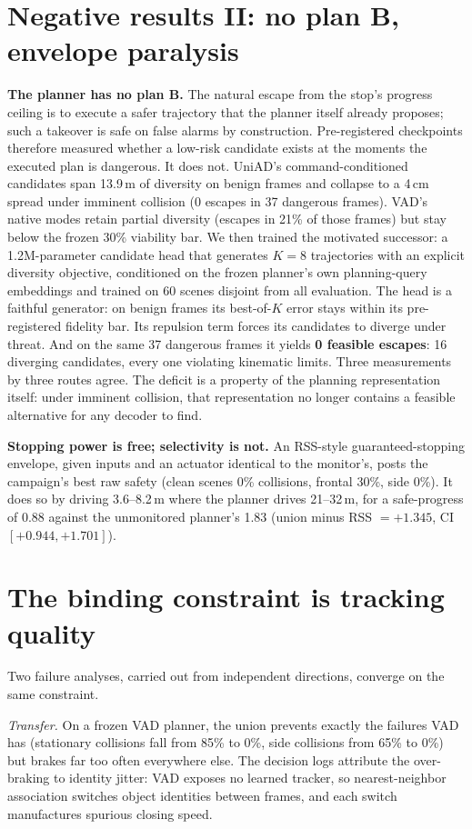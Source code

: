 \documentclass[11pt]{article}
\begin{document}
\section{Negative results II: no plan B, envelope paralysis}\label{sec:negII}
\textbf{The planner has no plan B.} The natural escape from the stop's progress ceiling is to
execute a safer trajectory that the planner itself already proposes; such a takeover is safe
on false alarms by construction. Pre-registered checkpoints therefore measured whether a
low-risk candidate exists at the moments the executed plan is dangerous. It does not. UniAD's
command-conditioned candidates span 13.9\,m of diversity on benign frames and collapse to a
4\,cm spread under imminent collision (0 escapes in 37 dangerous frames). VAD's native modes
retain partial diversity (escapes in 21\% of those frames) but stay below the frozen 30\%
viability bar. We then trained the motivated successor: a 1.2M-parameter candidate head that
generates $K{=}8$ trajectories with an explicit diversity objective, conditioned on the frozen
planner's own planning-query embeddings and trained on 60 scenes disjoint from all evaluation.
The head is a faithful generator: on benign frames its best-of-$K$ error stays within its
pre-registered fidelity bar. Its repulsion term forces its candidates to diverge under threat.
And on the same 37 dangerous frames it yields \textbf{0 feasible escapes}: 16 diverging
candidates, every one violating kinematic limits. Three measurements by three routes agree.
The deficit is a property of the planning representation itself: under imminent collision,
that representation no longer contains a feasible alternative for any decoder to find.

\textbf{Stopping power is free; selectivity is not.} An RSS-style guaranteed-stopping
envelope, given inputs and an actuator identical to the monitor's, posts the campaign's best
raw safety (clean scenes 0\% collisions, frontal 30\%, side 0\%). It does so by driving
3.6--8.2\,m where the planner drives 21--32\,m, for a safe-progress of 0.88 against the
unmonitored planner's 1.83 (union minus RSS $= +1.345$, CI $[+0.944, +1.701]$).

\section{The binding constraint is tracking quality}\label{sec:tracking}
Two failure analyses, carried out from independent directions, converge on the same
constraint.

\emph{Transfer.} On a frozen VAD planner, the union prevents exactly the failures VAD has
(stationary collisions fall from 85\% to 0\%, side collisions from 65\% to 0\%) but brakes far
too often everywhere else. The decision logs attribute the over-braking to identity jitter:
VAD exposes no learned tracker, so nearest-neighbor association switches object identities
between frames, and each switch manufactures spurious closing speed.
\end{document}
